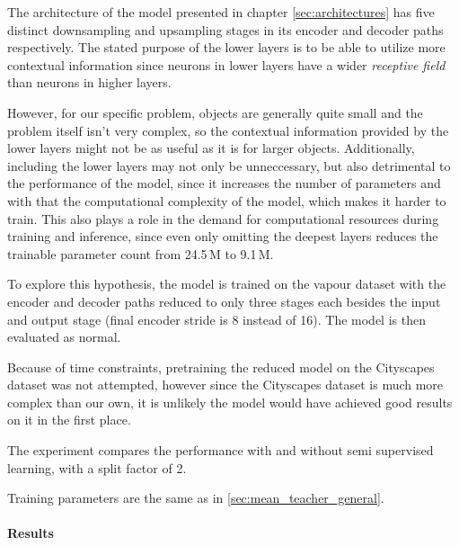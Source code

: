 The architecture of the model presented in chapter \ref{sec:architectures} has five distinct downsampling and upsampling stages in its encoder and decoder paths respectively.
The stated purpose of the lower layers is to be able to utilize more contextual information since neurons in lower layers have a wider \emph{receptive field} than neurons in higher layers.

However, for our specific problem, objects are generally quite small  and the problem itself isn't very complex, so the contextual information provided by the lower layers might not be as useful as it is for larger objects.
Additionally, including the lower layers may not only be unneccessary, but also detrimental to the performance of the model, since it increases the number of parameters and with that the computational complexity of the model, which makes it harder to train. 
This also plays a role in the demand for computational resources during training and inference, since even only omitting the deepest layers reduces the trainable parameter count from 24.5\,M to 9.1\,M.

To explore this hypothesis, the model is trained on the vapour dataset with the encoder and decoder paths reduced to only three stages each besides the input and output stage (final encoder stride is 8 instead of 16). The model is then evaluated as normal.

Because of time constraints, pretraining the reduced model on the Cityscapes dataset was not attempted, however since the Cityscapes dataset is much more complex than our own, it is unlikely the model would have achieved good results on it in the first place.

The experiment compares the performance with and without semi supervised learning, with a split factor of 2.

Training parameters are the same as in \ref{sec:mean_teacher_general}.

\paragraph{Results}
